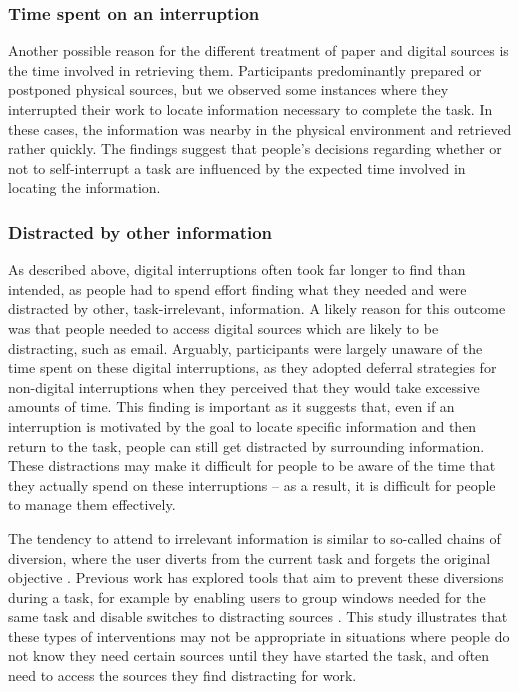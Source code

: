 \subsubsection{Time spent on an interruption}
Another possible reason for the different treatment of paper and digital sources is the time involved in retrieving them. Participants predominantly prepared or postponed physical sources, but we observed some instances where they interrupted their work to locate information necessary to complete the task. In these cases, the information was nearby in the physical environment and retrieved rather quickly. The findings suggest that people's decisions regarding whether or not to self-interrupt a task are influenced by the expected time involved in locating the information.

\subsubsection{Distracted by other information}
As described above, digital interruptions often took far longer to find than intended, as people had to spend effort finding what they needed and were distracted by other, task-irrelevant, information. A likely reason for this outcome was that people needed to access digital sources which are likely to be distracting, such as email. Arguably, participants were largely unaware of the time spent on these digital interruptions, as they adopted deferral strategies for non-digital interruptions when they perceived that they would take excessive amounts of time. This finding is important as it suggests that, even if an interruption is motivated by the goal to locate specific information and then return to the task, people can still get distracted by surrounding information. These distractions may make it difficult for people to be aware of the time that they actually spend on these interruptions \citep{Borghouts2018a} – as a result, it is difficult for people to manage them effectively.

The tendency to attend to irrelevant information is similar to so-called chains of diversion, where the user diverts from the current task and forgets the original objective \citep{Hanrahan2015, Iqbal2007}. Previous work has explored tools that aim to prevent these diversions during a task, for example by enabling users to group windows needed for the same task \citep{Smith2003} and disable switches to distracting sources \citep{Kim2017}. This study illustrates that these types of interventions may not be appropriate in situations where people do not know they need certain sources until they have started the task, and often need to access the sources they find distracting for work.

